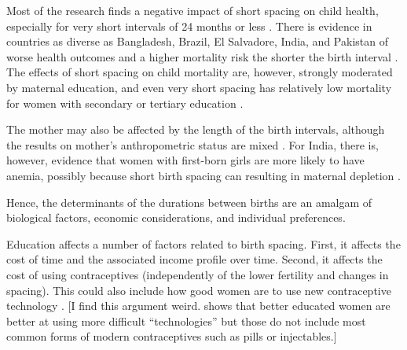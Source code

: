 Most of the research finds a negative impact of short spacing on child health, especially 
for very short intervals of 24 months or less 
\citep{Conde-Agudelo2006,Conde-Agudelo2012,Molitoris2019}.
There is evidence in countries as diverse as Bangladesh, Brazil, El Salvadore, India,
and Pakistan of worse health outcomes and a higher mortality risk the shorter the birth
interval
\citep{Cleland1984,Curtis1993,Whitworth2002,Bhargava2003,Rutstein2005,Bhalotra2008,Davanzo2008,Maitra2008,Makepeace2008,Gribble2009,Jayachandran2011,Saha2013,Jayachandran2017a,Ghosh2018}.
The effects of short spacing on child mortality are, however, strongly moderated by
maternal education, and even very short spacing has relatively low mortality for women
with secondary or tertiary education \citep{Molitoris2019}.

The mother may also be affected by the length of the birth intervals, although the
results on mother's anthropometric status are mixed \citep{Dewey2007,Conde-Agudelo2012}.
For India, there is, however, evidence that women with first-born girls are more likely to 
have anemia, possibly because short birth spacing can resulting in maternal depletion 
\citep{Milazzo2018}.











Hence, the determinants of the durations between births are an amalgam of biological 
factors, economic considerations, and individual preferences.






Education affects a number of factors related to birth spacing.
First, it affects the cost of time and the associated income profile over time.
Second, it affects the cost of using contraceptives (independently of the lower fertility
and changes in spacing). This could also include how good women are to use new 
contraceptive technology \citep{Kim2010}.
[I find this argument weird. \citep{Rosenzweig1989} shows that better educated women
are better at using more difficult ``technologies'' but those do not include most common
forms of modern contraceptives such as pills or injectables.]


